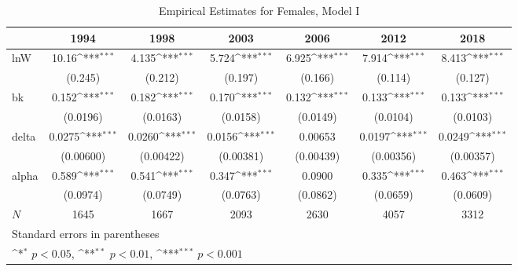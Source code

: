 \documentclass[12pt,a4paper]{article}
\begin{document}
\begin{table}[h!]\centering
	\def\sym#1{\ifmmode^{#1}\else\(^{#1}\)\fi}
	\caption{Empirical Estimates for Females, Model I}
	\begin{tabular}{l*{6}{c}}
		\hline\hline
		&\multicolumn{1}{c}{1994}&\multicolumn{1}{c}{1998}&\multicolumn{1}{c}{2003}&\multicolumn{1}{c}{2006}&\multicolumn{1}{c}{2012}&\multicolumn{1}{c}{2018}\\
		\hline
		lnW      &       10.16\sym{***}&       4.135\sym{***}&       5.724\sym{***}&       6.925\sym{***}&       7.914\sym{***}&       8.413\sym{***}\\
		&     (0.245)         &     (0.212)         &     (0.197)         &     (0.166)         &     (0.114)         &     (0.127)         \\
		\hline
		bk       &       0.152\sym{***}&       0.182\sym{***}&       0.170\sym{***}&       0.132\sym{***}&       0.133\sym{***}&       0.133\sym{***}\\
		&    (0.0196)         &    (0.0163)         &    (0.0158)         &    (0.0149)         &    (0.0104)         &    (0.0103)         \\
		\hline
		delta     &      0.0275\sym{***}&      0.0260\sym{***}&      0.0156\sym{***}&     0.00653         &      0.0197\sym{***}&      0.0249\sym{***}\\
		&   (0.00600)         &   (0.00422)         &   (0.00381)         &   (0.00439)         &   (0.00356)         &   (0.00357)         \\
		\hline
		alpha       &       0.589\sym{***}&       0.541\sym{***}&       0.347\sym{***}&      0.0900         &       0.335\sym{***}&       0.463\sym{***}\\
		&    (0.0974)         &    (0.0749)         &    (0.0763)         &    (0.0862)         &    (0.0659)         &    (0.0609)         \\
		\hline
		\(N\)       &        1645         &        1667         &        2093         &        2630         &        4057         &        3312         \\
		\hline\hline
		\multicolumn{7}{l}{\footnotesize Standard errors in parentheses}\\
		\multicolumn{7}{l}{\footnotesize \sym{*} \(p<0.05\), \sym{**} \(p<0.01\), \sym{***} \(p<0.001\)}\\
	\end{tabular}
\end{table}
\end{document}
